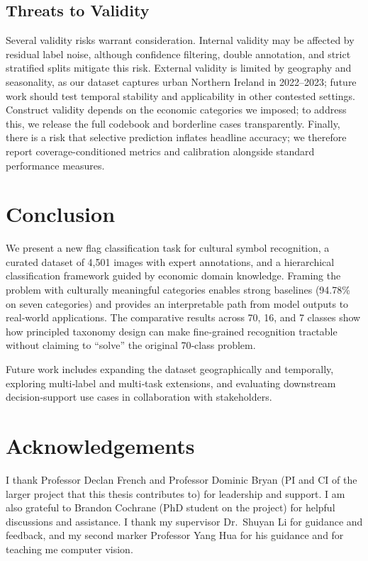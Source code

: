\documentclass[
  a4paper,
]{article}
\begin{document}
\subsection{Threats to Validity}\label{threats-to-validity}

Several validity risks warrant consideration. Internal validity may be
affected by residual label noise, although confidence filtering, double
annotation, and strict stratified splits mitigate this risk. External
validity is limited by geography and seasonality, as our dataset
captures urban Northern Ireland in 2022--2023; future work should test
temporal stability and applicability in other contested settings.
Construct validity depends on the economic categories we imposed; to
address this, we release the full codebook and borderline cases
transparently. Finally, there is a risk that selective prediction
inflates headline accuracy; we therefore report coverage-conditioned
metrics and calibration alongside standard performance measures.

\section{Conclusion}\label{conclusion}

We present a new flag classification task for cultural symbol
recognition, a curated dataset of 4,501 images with expert annotations,
and a hierarchical classification framework guided by economic domain
knowledge. Framing the problem with culturally meaningful categories
enables strong baselines (94.78\% on seven categories) and provides an
interpretable path from model outputs to real‑world applications. The
comparative results across 70, 16, and 7 classes show how principled
taxonomy design can make fine‑grained recognition tractable without
claiming to ``solve'' the original 70‑class problem.

Future work includes expanding the dataset geographically and
temporally, exploring multi‑label and multi‑task extensions, and
evaluating downstream decision‑support use cases in collaboration with
stakeholders.

\section{Acknowledgements}\label{acknowledgements}

I thank Professor Declan French and Professor Dominic Bryan (PI and CI
of the larger project that this thesis contributes to) for leadership
and support. I am also grateful to Brandon Cochrane (PhD student on the
project) for helpful discussions and assistance. I thank my supervisor
Dr.~Shuyan Li for guidance and feedback, and my second marker Professor
Yang Hua for his guidance and for teaching me computer vision.
\end{document}
